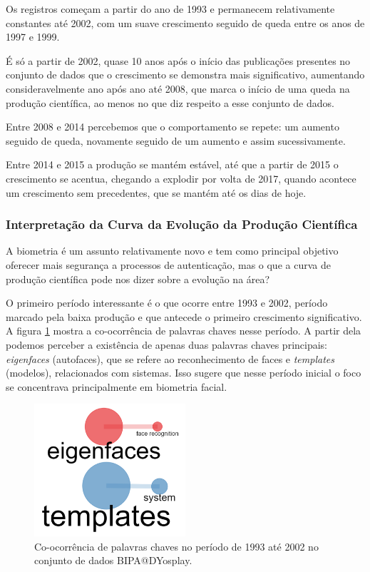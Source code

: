 Os registros começam a partir do ano de 1993 e permanecem relativamente constantes até 2002, com um suave crescimento seguido de queda entre os anos de 1997 e 1999.

É só a partir de 2002, quase 10 anos após o início das publicações presentes no conjunto de dados que o crescimento se demonstra mais significativo, aumentando consideravelmente ano após ano até 2008, que marca o início de uma queda na produção científica, ao menos no que diz respeito a esse conjunto de dados.

Entre 2008 e 2014 percebemos que o comportamento se repete: um aumento seguido de queda, novamente seguido de um aumento e assim sucessivamente.

Entre 2014 e 2015 a produção se mantém estável, até que a partir de 2015 o crescimento se acentua, chegando a explodir por volta de 2017, quando acontece um crescimento sem precedentes, que se mantém até os dias de hoje.

\subsubsection{Interpretação da Curva da Evolução da Produção Científica}

A biometria é um assunto relativamente novo e tem como principal objetivo oferecer mais segurança a processos de autenticação, mas o que a curva de produção científica pode nos dizer sobre a evolução na área?

O primeiro período interessante é o que ocorre entre 1993 e 2002, período marcado pela baixa produção e que antecede o primeiro crescimento significativo. A figura \ref{fig:CoOcurrence1993-2002:BIPA@DYosplay} mostra a co-ocorrência de palavras chaves nesse período. A partir dela podemos perceber a existência de apenas duas palavras chaves principais: \textit{eigenfaces} (autofaces), que se refere ao reconhecimento de faces e \textit{templates} (modelos), relacionados com sistemas. Isso sugere que nesse período inicial o foco se concentrava principalmente em biometria facial.

\begin{figure}[H]
    \centering
    \includegraphics[width=0.5\textwidth]{experiments/DYosplay/PesquisaBibliometrica/Imagens/BIPA@DYosplay_CoOcurrenceNetwork1993-2002.png}
    \caption{Co-ocorrência de palavras chaves no período de 1993 até 2002 no conjunto de dados BIPA@DYosplay.}
    \label{fig:CoOcurrence1993-2002:BIPA@DYosplay}
\end{figure}

